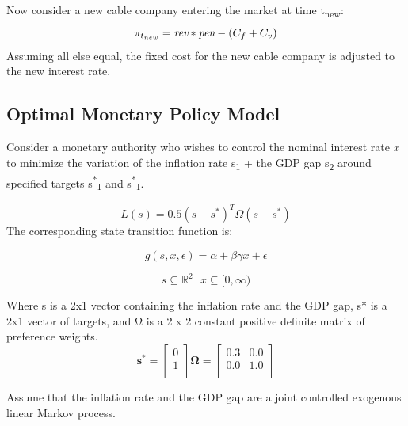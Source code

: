 \documentclass[a4paper,oneside]{article}
\begin{document}
Now consider a new cable company entering the market at time t\textsubscript{new}:
\begin{equation}
	\pi_{t_{new}} = \emph{rev} * \emph{pen} - (C_{f}+C_{v})
\end{equation}
Assuming all else equal, the fixed cost for the new cable company is adjusted to the new interest rate.

\subsection{Optimal Monetary Policy Model}

\:\:\:\:\:\:\:\:Consider a monetary authority who wishes to control the nominal interest rate  \emph{x} to minimize the variation of the inflation rate s\textsubscript{1} + the GDP gap s\textsubscript{2} around specified targets s\textsuperscript{*}\textsubscript{1} and s\textsuperscript{*}\textsubscript{1}.

\begin{equation}
	L(s) = 0.5(s-s^{*})^{T}\Omega(s-s^{*})
	\label{eq:mye1}
\end{equation} 
The corresponding state transition function is: 

\begin{equation}
	g(s,x,\epsilon) = \alpha + \beta \gamma x + \epsilon
	\label{eq:myeq2}
\end{equation} 

\begin{equation*}
s \subseteq \mathbb{R}^{2} \:\:\:	
x \subseteq [0, \infty)
\end{equation*}

Where s is a 2x1 vector containing the inflation rate and the GDP gap, s* is a 2x1 vector of targets, and Ω is a 2 x 2 constant positive definite matrix of preference weights. 
\begin{equation*} %
	\bm{s^{*}} = 
		\left.
			\begin{bmatrix}
				0	\\
				1	\\
			\end{bmatrix}
		\right.
	\bm{\Omega} = 
		\left.
			\begin{bmatrix}
				0.3	&	0.0\\
				0.0	&	1.0\\
			\end{bmatrix}
		\right.
\end{equation*}

Assume that the inflation rate and the GDP gap are a joint controlled exogenous linear Markov process.
\end{document}
